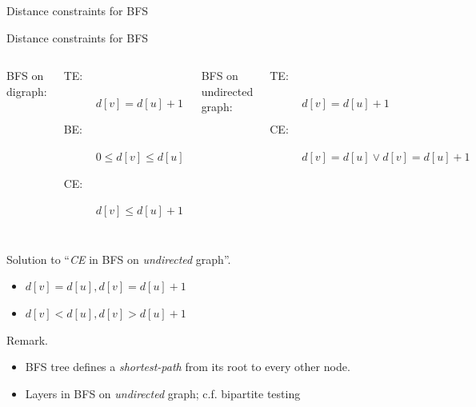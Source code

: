 \begin{frame}{Distance constraints for BFS}
  \begin{exampleblock}{Distance constraints for BFS }
    \begin{columns}[t]
        BFS on digraph:
	\begin{description}
	  \item[TE:] $d[v] = d[u] + 1$
	  \item[BE:] $0 \le d[v] \le d[u]$
	  \item[CE:] $d[v] \le d[u] + 1$
	\end{description}
        BFS on undirected graph:
	\begin{description}
	  \item[TE:] $d[v] = d[u] + 1$
	  \item[CE:] $d[v] = d[u] \lor d[v] = d[u] + 1$ 
	\end{description}
    \end{columns}
  \end{exampleblock}

  \begin{block}{Solution to ``\emph{CE} in BFS on \emph{undirected} graph''.}
    \begin{itemize}
      \item $d[v] = d[u], d[v] = d[u] + 1$
      \item $d[v] < d[u], d[v] > d[u] + 1$
    \end{itemize}
  \end{block}

  \begin{alertblock}{Remark.}
    \begin{itemize}
      \item BFS tree defines a \emph{shortest-path} from its root to every other node.
      \item Layers in BFS on \emph{undirected} graph; c.f. bipartite testing 
    \end{itemize}
  \end{alertblock}
\end{frame}
